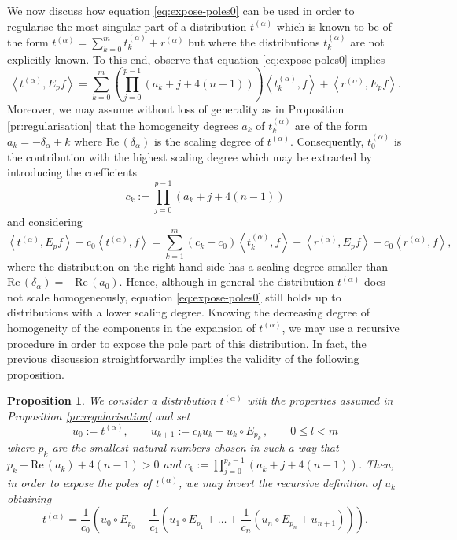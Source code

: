 \documentclass[a4paper,10pt,twoside]{article}
\numberwithin{equation}{section}
\newcounter{and}
\def\Ree{\mathrm{Re}\,}
\theoremstyle{plain}
\newtheorem{propo}[theo]{Proposition}
\theoremstyle{definition}
\begin{document}
We now discuss how equation \eqref{eq:expose-poles0} can be used in order to regularise the most singular part of a distribution 
$t^{(\alpha)}$ which is known to be of the form $t^{(\alpha)} = \sum_{k=0}^m t^{(\alpha)}_k + r^{(\alpha)}$ but where the distributions $ t^{(\alpha)}_k$ are not explicitly known. To this end, observe that equation \eqref{eq:expose-poles0} implies
\[
\left\langle t^{(\alpha)}, E_p f \right\rangle = 
\sum_{k=0}^m \left(\prod_{j=0}^{p-1} (a_k+j+4(n-1)) \right)  \left\langle t^{(\alpha)}_k, f \right\rangle + \left\langle r^{(\alpha)},E_p f\right\rangle.
\]
Moreover, we may assume without loss of generality as in Proposition \ref{pr:regularisation} that the homogeneity degrees $a_k$ of $t^{(\alpha)}_k$ are of the form $a_k=-\delta_\alpha + k$ where $\Ree(\delta_\alpha)$ is the scaling degree of $t^{(\alpha)}$. Consequently, $t^{(\alpha)}_0$ is the contribution with the highest scaling degree which may be extracted by introducing the coefficients
\[
c_k:=\prod_{j=0}^{p-1} \left(a_k+j+4(n-1)\right)
\]
and considering 
%
\begin{equation}\label{eq:decrease-scaling-degree}
\left\langle t^{(\alpha)}, E_p f \right\rangle - c_0   \left\langle t^{(\alpha)}, f \right\rangle   =
\sum_{k=1}^m (c_k-c_0)   \left\langle t^{(\alpha)}_k, f \right\rangle +  \left\langle r^{(\alpha)}, E_p f \right\rangle - c_0 \left\langle r^{(\alpha)}, f \right\rangle,
\end{equation}
%
where the distribution on the right hand side has a scaling degree smaller than $\Ree(\delta_\alpha) = - \Ree (a_0)$. Hence, although in general the distribution $t^{(\alpha)}$ does not scale homogeneously, equation \eqref{eq:expose-poles0} still holds up to distributions with a lower scaling degree. Knowing the decreasing degree of homogeneity of the components in the expansion of $t^{(\alpha)}$, we may use a recursive procedure in order to expose the pole part of this distribution. In fact, the previous discussion straightforwardly implies the validity of the following proposition.


\begin{propo}\label{pr:expose-poles}
We consider a distribution $t^{(\alpha)}$ with the properties assumed in Proposition \ref{pr:regularisation} and set
\[
u_0 := t^{(\alpha)},\qquad    u_{k+1} :=  c_k u_k -  u_k \circ E_{p_k}\,  , \qquad 0\le l< m
\]
where $p_k$ are the smallest natural numbers chosen in such a way that $p_k+\Ree (a_k)+4(n-1)>0$ and $c_k :=\prod_{j=0}^{p_k-1} \left(a_k+j+4(n-1)\right)$.
Then, in order to expose the poles of $t^{(\alpha)}$, we may invert the recursive definition of $u_k$ obtaining
\begin{equation}\label{eq:expose-poles}
t^{(\alpha)} = \frac{1}{c_0} \left( u_0\circ E_{p_0} +  \frac{1}{c_1} \left( u_1 \circ E_{p_1} +\dots +\frac{1}{c_n}\left(  u_n \circ E_{p_n}+ u_{n+1}   \right)   \right)\right).
\end{equation}
\end{propo}
\end{document}
